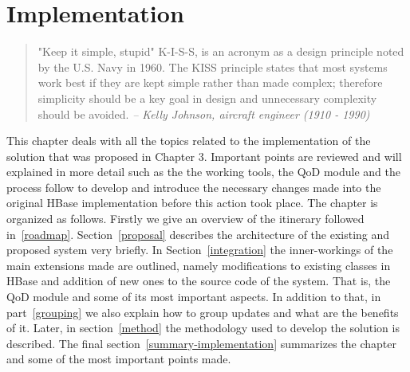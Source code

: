 
\chapter{Implementation}

\label{ch:implemenation}

\begin{quotation}
"Keep it simple, stupid" K-I-S-S, is an acronym as a design principle noted by the U.S. Navy in 1960. The KISS principle states that most systems work best if they are kept simple rather than made complex; therefore simplicity should be a key goal in design and unnecessary complexity should be avoided.
{\small\it -- Kelly Johnson, aircraft engineer (1910 - 1990)}
\end{quotation}


This chapter deals with all the topics related to the implementation of the solution that was proposed in Chapter 3. Important points are reviewed and will explained in more detail such as the the working tools, the QoD module and the process follow to develop and introduce the necessary changes made into the original HBase implementation before this action took place. The chapter is organized as follows. Firstly we give an overview of the itinerary followed in~\ref{roadmap}. Section~\ref{proposal} describes the architecture of the existing and proposed system very briefly. In Section~\ref{integration} the inner-workings of the main extensions made are outlined, namely modifications to existing classes in HBase and addition of new ones to the source code of the system. That is, the QoD module and some of its most important aspects. In addition to that, in part~\ref{grouping} we also explain how to group updates and what are the benefits of it. Later, in section~\ref{method} the methodology used to develop the solution is described. The final section~\ref{summary-implementation} summarizes the chapter and some of the most important points made.

